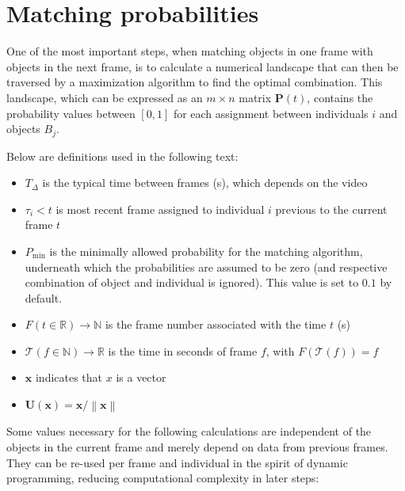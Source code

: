 \documentclass[9pt,lineno]{elife}
\newcommand{\norm}[1]{\left\lVert#1\right\rVert}
\newcommand*\mean[1]{\bar{#1}}
\newcommand{\Tau}{\mathcal{T}}
\begin{document}
\begin{appendixbox}
\label{first:app}
\section{Matching probabilities}

One of the most important steps, when matching objects in one frame with objects in the next frame, is to calculate a numerical landscape that can then be traversed by a maximization algorithm to find the optimal combination. This landscape, which can be expressed as an $m\times n$ matrix $\mathbf{P}(t)$, contains the probability values between $[0,1]$ for each assignment between individuals $i$ and objects $B_j$.

Below are definitions used in the following text:

\begin{itemize}
    \item $T_\Delta$ is the typical time between frames (s), which depends on the video
    \item $\tau_i < t$ is most recent frame assigned to individual $i$ previous to the current frame $t$
    \item $P_\mathrm{min}$ is the minimally allowed probability for the matching algorithm, underneath which the probabilities are assumed to be zero (and respective combination of object and individual is ignored). This value is set to $0.1$ by default.
    \item $ F(t\in\mathbb{R}) \rightarrow \mathbb{N} $ is the frame number associated with the time $t$ (s)
    \item $ \Tau(f\in\mathbb{N}) \rightarrow \mathbb{R} $ is the time in seconds of frame $f$, with $F(\Tau(f)) = f$
    \item $\mathbf{x}$ indicates that $x$ is a vector
    \item $ \mathbf{U}(\mathbf{x}) = \mathbf{x} / \norm{\mathbf{x}} $
\end{itemize}

Some values necessary for the following calculations are independent of the objects in the current frame and merely depend on data from previous frames. They can be re-used per frame and individual in the spirit of dynamic programming, reducing computational complexity in later steps:


\end{appendixbox}
\end{document}
